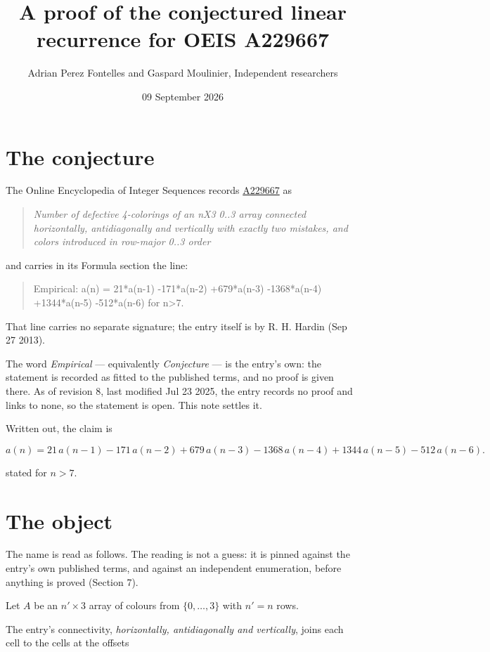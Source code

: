 \documentclass[11pt]{article}
\title{A proof of the conjectured linear recurrence for OEIS A229667}
\author{Adrian Perez Fontelles and Gaspard Moulinier, Independent researchers}
\date{09 September 2026}
\theoremstyle{definition}
\begin{document}
\maketitle
\section{The conjecture}

The Online Encyclopedia of Integer Sequences records \href{https://oeis.org/A229667}{A229667} as

\begin{quote}\itshape Number of defective 4-colorings of an nX3 0..3 array connected horizontally, antidiagonally and vertically with exactly two mistakes, and colors introduced in row-major 0..3 order\end{quote}

and carries in its Formula section the line:

\begin{quote}\ttfamily Empirical: a(n) = 21*a(n-1) -171*a(n-2) +679*a(n-3) -1368*a(n-4) +1344*a(n-5) -512*a(n-6) for n>7.\end{quote}

That line carries no separate signature; the entry itself is by R. H. Hardin (Sep 27 2013).

The word {\itshape Empirical} --- equivalently {\itshape Conjecture} --- is the entry's own: the statement is recorded as fitted to the published terms, and no proof is given there. As of revision 8, last modified Jul 23 2025, the entry records no proof and links to none, so the statement is open. This note settles it.

Written out, the claim is

\[a(n) = 21\,a(n-1) - 171\,a(n-2) + 679\,a(n-3) - 1368\,a(n-4) + 1344\,a(n-5) - 512\,a(n-6).\]

stated for $n > 7$.

\section{The object}

The name is read as follows. The reading is not a guess: it is pinned against the entry's own published terms, and against an independent enumeration, before anything is proved (Section 7).

Let $A$ be an $n' \times 3$ array of colours from $\{0,\dots,3\}$ with $n' = n$ rows.

The entry's connectivity, {\itshape horizontally, antidiagonally and vertically}, joins each cell to the cells at the offsets
\end{document}

